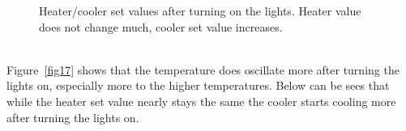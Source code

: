 \documentclass[12pt]{scrartcl}
\begin{document}
      \begin{figure}[h!]
        \hspace{-40pt}
        \hspace{-20pt}
        \caption{Heater/cooler set values after turning on the lights. Heater value
        does not change much, cooler set value increases.}
        \label{fig18}
      \end{figure}\\
      \noindent Figure~\ref{fig17} shows that the temperature does oscillate more after
      turning the lights on, especially more to the higher temperatures.
      Below can be sees that while the heater set value nearly stays the same the
      cooler starts cooling more after turning the lights on.
      \newpage
\end{document}
